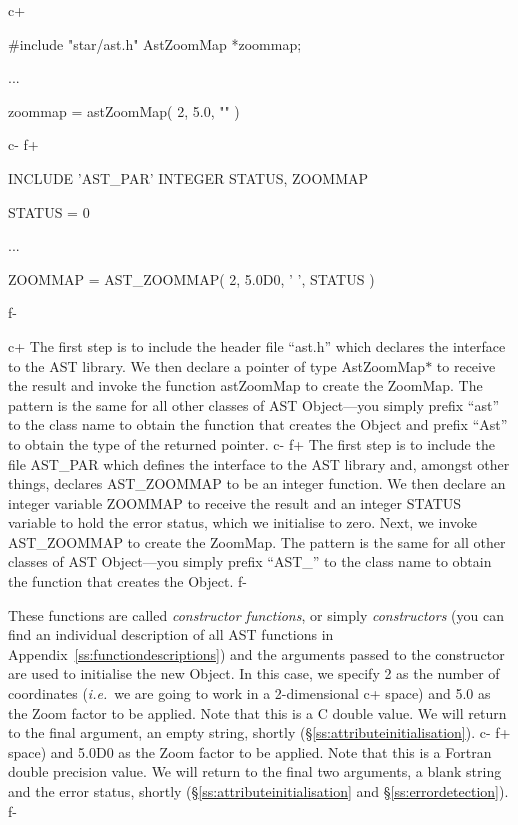 \documentclass[twoside,11pt]{starlink}
\providecommand{\appref}[1]{Appendix~\ref{#1}}
\providecommand{\secref}[1]{\S\ref{#1}}
\begin{document}
c+
\small
\begin{terminalv}
#include "star/ast.h"
AstZoomMap *zoommap;

...

zoommap = astZoomMap( 2, 5.0, "" )
\end{terminalv}
\normalsize
c-
f+
\small
\begin{terminalv}
      INCLUDE 'AST_PAR'
      INTEGER STATUS, ZOOMMAP

      STATUS = 0

      ...

      ZOOMMAP = AST_ZOOMMAP( 2, 5.0D0, ' ', STATUS )
\end{terminalv}
\normalsize
f-

c+
The first step is to include the header file ``ast.h'' which declares
the interface to the AST library.  We then declare a pointer of type
AstZoomMap$*$ to receive the result and invoke the function astZoomMap
to create the ZoomMap. The pattern is the same for all other classes
of AST Object---you simply prefix ``ast'' to the class name to obtain
the function that creates the Object and prefix ``Ast'' to obtain the
type of the returned pointer.
c-
f+
The first step is to include the file AST\_PAR which defines the
interface to the AST library and, amongst other things, declares
AST\_ZOOMMAP to be an integer function.  We then declare an integer
variable ZOOMMAP to receive the result and an integer STATUS variable
to hold the error status, which we initialise to zero. Next, we invoke
AST\_ZOOMMAP to create the ZoomMap. The pattern is the same for all
other classes of AST Object---you simply prefix ``AST\_'' to the class
name to obtain the function that creates the Object.
f-

These functions are called \emph{constructor functions}, or simply
\emph{constructors} (you can find an individual description of all AST
functions in \appref{ss:functiondescriptions}) and the arguments
passed to the constructor are used to initialise the new Object. In
this case, we specify 2 as the number of coordinates (\emph{i.e.}\ we
are going to work in a 2-dimensional
c+
space) and 5.0 as the Zoom factor to be applied. Note that this is a C
double value. We will return to the final argument, an empty string,
shortly (\secref{ss:attributeinitialisation}).
c-
f+
space) and 5.0D0 as the Zoom factor to be applied. Note that this is a
Fortran double precision value. We will return to the final two
arguments, a blank string and the error status, shortly
(\secref{ss:attributeinitialisation} and \secref{ss:errordetection}).
f-
\end{document}
